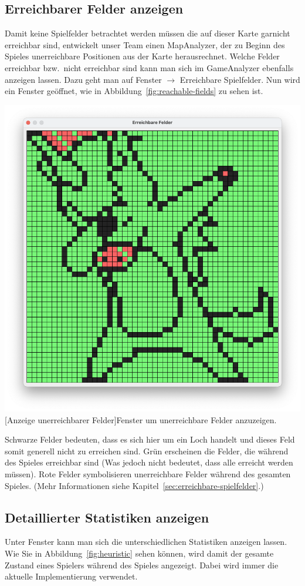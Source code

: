 \subsection{Erreichbarer Felder anzeigen}\label{subsec:erreichbarer-felder-anzeigen}
Damit keine Spielfelder betrachtet werden m\"ussen die auf dieser Karte garnicht erreichbar sind, entwickelt unser Team einen MapAnalyzer, der zu Beginn des Spieles unerreichbare Positionen aus der Karte herausrechnet.
Welche Felder erreichbar bzw.\ nicht erreichbar sind kann man sich im GameAnalyzer ebenfalls anzeigen lassen.
Dazu geht man auf Fenster $\rightarrow$ Erreichbare Spielfelder.
Nun wird ein Fenster ge\"offnet, wie in Abbildung~\ref{fig:reachable-fields} zu sehen ist.

\vspace{1em}
\begin{minipage}{\linewidth}
    \centering
    \includegraphics[width=0.6\linewidth]{pics/reachable-fields}
    [Anzeige unerreichbarer Felder]{Fenster um unerreichbare Felder anzuzeigen.}
    \label{fig:reachable-fields}
\end{minipage}

Schwarze Felder bedeuten, dass es sich hier um ein Loch handelt und dieses Feld somit generell nicht zu erreichen sind.
Gr\"un erscheinen die Felder, die w\"ahrend des Spieles erreichbar sind (Was jedoch nicht bedeutet, dass alle erreicht werden m\"ussen).
Rote Felder symbolisieren unerreichbare Felder w\"ahrend des gesamten Spieles.
(Mehr Informationen siehe Kapitel~\ref{sec:erreichbare-spielfelder}.)

\subsection{Detaillierter Statistiken anzeigen}\label{subsec:detaillierter-statistiken-anzeigen}
Unter Fenster kann man sich die unterschiedlichen Statistiken anzeigen lassen.
Wie Sie in Abbildung~\ref{fig:heuristic} sehen k\"onnen, wird damit der gesamte Zustand eines Spielers w\"ahrend des Spieles angezeigt.
Dabei wird immer die aktuelle Implementierung verwendet.

